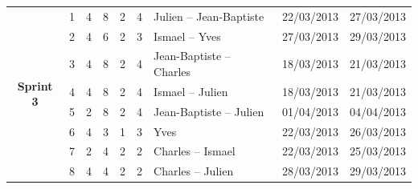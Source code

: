 \documentclass[a4paper,11pt,french]{article}
\begin{document}
\begin{landscape}
\begin{tabularx}{20cm}{|c|r|r|r|r|r|X|c|c|}
\hline
\multirow{8}{*}{\begin{sideways}\textbf{Sprint 3}\end{sideways}}& 1& 4& 8& 2& 4& Julien -- Jean-Baptiste& 22/03/2013& 27/03/2013\\
\cline{2-9}
& 2& 4& 6& 2& 3& Ismael -- Yves& 27/03/2013& 29/03/2013\\
\cline{2-9}
& 3& 4& 8& 2& 4& Jean-Baptiste -- Charles& 18/03/2013& 21/03/2013\\
\cline{2-9}
& 4& 4& 8& 2& 4& Ismael -- Julien& 18/03/2013& 21/03/2013\\
\cline{2-9}
& 5& 2& 8& 2& 4& Jean-Baptiste -- Julien& 01/04/2013& 04/04/2013\\
\cline{2-9}
& 6& 4& 3& 1& 3& Yves& 22/03/2013& 26/03/2013\\
\cline{2-9}
& 7& 2& 4& 2& 2& Charles -- Ismael& 22/03/2013& 25/03/2013\\
\cline{2-9}
& 8& 4& 4& 2& 2& Charles -- Julien& 28/03/2013& 29/03/2013\\

\hline


\end{tabularx}
\end{landscape}
\end{document}
